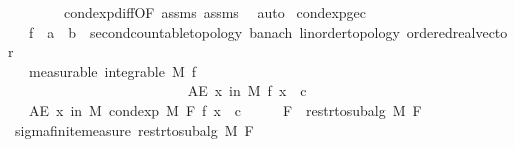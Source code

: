 \begin{isabellebody}
\ \ \ \ \ \ \ \ cond{\isacharunderscore}{\kern0pt}exp{\isacharunderscore}{\kern0pt}diff{\isacharbrackleft}{\kern0pt}OF\ assms{\isacharparenleft}{\kern0pt}{}{\isacharcomma}{\kern0pt}{}{\isacharparenright}{\kern0pt}{\isacharbrackright}{\kern0pt}\ assms{\isacharparenleft}{\kern0pt}{}{\isacharparenright}{\kern0pt}\ \isamarkupfalse%
\ auto%
\endisatagproof
{\isafoldproof}%
%
\isadelimproof
\isanewline
%
\endisadelimproof
\isanewline
{}\isamarkupfalse%
\ cond{\isacharunderscore}{\kern0pt}exp{\isacharunderscore}{\kern0pt}ge{\isacharunderscore}{\kern0pt}c{\isacharcolon}{\kern0pt}\isanewline
\ \ \ f\ {\isacharcolon}{\kern0pt}{\isacharcolon}{\kern0pt}\ {\isachardoublequoteopen}{\isacharprime}{\kern0pt}a\ {\isasymRightarrow}\ {\isacharprime}{\kern0pt}b\ {\isacharcolon}{\kern0pt}{\isacharcolon}{\kern0pt}\ {\isacharbraceleft}{\kern0pt}second{\isacharunderscore}{\kern0pt}countable{\isacharunderscore}{\kern0pt}topology{\isacharcomma}{\kern0pt}\ banach{\isacharcomma}{\kern0pt}\ linorder{\isacharunderscore}{\kern0pt}topology{\isacharcomma}{\kern0pt}\ ordered{\isacharunderscore}{\kern0pt}real{\isacharunderscore}{\kern0pt}vector{\isacharbraceright}{\kern0pt}{\isachardoublequoteclose}\isanewline
\ \ \ {\isacharbrackleft}{\kern0pt}measurable{\isacharbrackright}{\kern0pt}{\isacharcolon}{\kern0pt}\ {\isachardoublequoteopen}integrable\ M\ f{\isachardoublequoteclose}\ \ \ \ \ \ \ \ \ \ \ \ \ \ \ \ \ \ \ \ \ \ \ \ \ \ \ \ \ \ \ \ \ \ \ \ \ \ \ \ \ \ \ \ \ \ \ \ \ \ \ \ \ \ \ \ \ \ \ \ \ \ \ \isanewline
\ \ \ \ \ \ \ {\isachardoublequoteopen}AE\ x\ in\ M{\isachardot}{\kern0pt}\ f\ x\ {\isasymge}\ c{\isachardoublequoteclose}\isanewline
\ \ \ {\isachardoublequoteopen}AE\ x\ in\ M{\isachardot}{\kern0pt}\ cond{\isacharunderscore}{\kern0pt}exp\ M\ F\ f\ x\ {\isasymge}\ c{\isachardoublequoteclose}\isanewline
%
\isadelimproof
%
\endisadelimproof
%
\isatagproof
{}\isamarkupfalse%
\ {\isacharminus}{\kern0pt}\isanewline
\ \ \isamarkupfalse%
\ {\isacharquery}{\kern0pt}F\ {\isacharequal}{\kern0pt}\ {\isachardoublequoteopen}restr{\isacharunderscore}{\kern0pt}to{\isacharunderscore}{\kern0pt}subalg\ M\ F{\isachardoublequoteclose}\isanewline
\ \ \isamarkupfalse%
\ sigma{\isacharunderscore}{\kern0pt}finite{\isacharunderscore}{\kern0pt}measure\ {\isachardoublequoteopen}restr{\isacharunderscore}{\kern0pt}to{\isacharunderscore}{\kern0pt}subalg\ M\ F{\isachardoublequoteclose}\ \isamarkupfalse%

\end{isabellebody}
